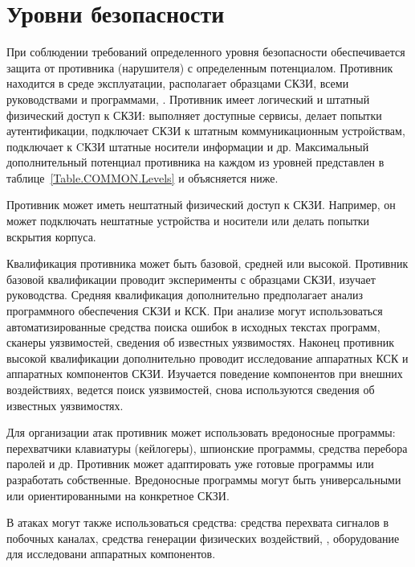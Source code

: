 \section{Уровни безопасности}\label{COMMON.Levels}

При соблюдении требований определенного уровня безопасности обеспечивается
защита от противника (нарушителя) с определенным потенциалом.
%
Противник находится в среде эксплуатации, 
располагает образцами СКЗИ, 
всеми руководствами и программами, . 
%
Противник имеет логический и штатный физический доступ к СКЗИ: 
выполняет доступные сервисы, 
делает попытки аутентификации,
подключает СКЗИ к штатным коммуникационным устройствам, 
подключает к CКЗИ штатные носители информации и др. 
%
Максимальный дополнительный потенциал противника на каждом из уровней 
представлен в таблице~\ref{Table.COMMON.Levels} и объясняется ниже.

Противник может иметь нештатный физический доступ к СКЗИ.
Например, он может подключать нештатные устройства и носители или 
делать попытки вскрытия корпуса.

Квалификация противника может быть базовой, средней или высокой.
%
Противник базовой квалификации проводит эксперименты с образцами СКЗИ, 
изучает руководства. 
%
Средняя квалификация дополнительно предполагает анализ программного обеспечения 
СКЗИ и КСК. При анализе могут использоваться автоматизированные средства поиска 
ошибок в исходных текстах программ, сканеры уязвимостей, сведения об известных 
уязвимостях.
%
Наконец противник высокой квалификации дополнительно проводит исследование
аппаратных КСК и аппаратных компонентов СКЗИ. Изучается поведение 
компонентов при внешних воздействиях, ведется поиск уязвимостей, 
снова используются сведения об известных уязвимостях.


Для организации атак противник может использовать вредоносные программы:
перехватчики клавиатуры (кейлогеры), шпионские программы, 
средства перебора паролей и др. 
%
Противник может адаптировать уже готовые программы или разработать собственные. 
%
Вредоносные программы могут быть универсальными или ориентированными на 
конкретное СКЗИ.

В атаках могут также использоваться  средства: 
средства перехвата сигналов в побочных каналах,
средства генерации физических воздействий,
,
оборудование для исследовани аппаратных компонентов.


